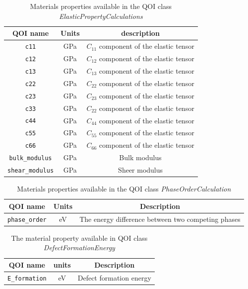 \begin{table}[p]
	\centering
	\caption{Materials properties available in the QOI class \emph{ElasticPropertyCalculations}}
	\label{tbl:pypospack_qoi_lmps_elastic}
	\begin{tabular}{ccc}
		\hline
		QOI name & Units &description \\
		\hline
		\verb|c11|
		  & GPa
		  & $C_{11}$ component of the elastic tensor\\
		\verb|c12|
		  & GPa
		  & $C_{12}$ component of the elastic tensor\\
		\verb|c13|
		  & GPa
		  & $C_{13}$ component of the elastic tensor \\
		\verb|c22|
		  & GPa
			& $C_{22}$ component of the elastic tensor \\
		\verb|c23|
			& GPa
			& $C_{23}$ component of the elastic tensor \\
		\verb|c33|
			& GPa
			& $C_{22}$ component of the elastic tensor \\
		\verb|c44|
			& GPa
			& $C_{44}$ component of the elastic tensor \\
		\verb|c55|
			& GPa
			& $C_{55}$ component of the elastic tensor \\
		\verb|c66|
			& GPa
			& $C_{66}$ component of the elastic tensor \\
		\verb|bulk_modulus|
			& GPa
			& Bulk modulus \\
		\verb|shear_modulus|
			& GPa
			& Sheer modulus \\
		\hline
	\end{tabular}
\end{table}

\begin{table}[p]
	\centering
	\caption{Materials properties available in the QOI class \emph{PhaseOrderCalculation}}
	\label{tbl:pypospack_qoi_lmps_phase_order}
	\begin{tabular}{ccc}
		\hline
		QOI name & Units & Description \\
		\hline
		\verb|phase_order|
		  & eV
			& The energy difference between two competing phases\\
		\hline
	\end{tabular}
\end{table}

\begin{table}[p]
	\centering
	\caption{The material property available in QOI class \emph{DefectFormationEnergy}}
	\label{tbl:pypospack_qoi_lmps_defect}
	\begin{tabular}{ccc}
		\hline
		QOI name & units & Description \\
		\hline
		\verb|E_formation|
		 	& eV
			& Defect formation energy\\
		\hline
	\end{tabular}
\end{table}

